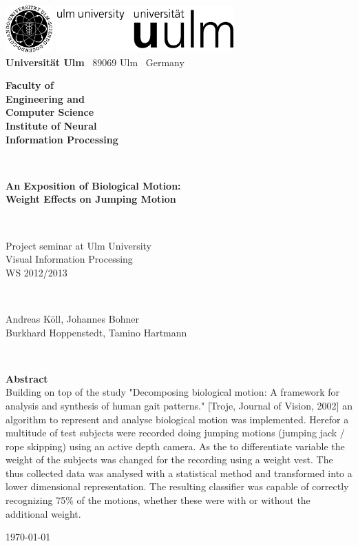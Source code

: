 \documentclass[a4paper]{article}
\begin{document}
\begin{titlepage}
\thispagestyle{empty}


\includegraphics[height=1.8cm]{unilogo_bild}
\hfill
\includegraphics[height=1.8cm]{unilogo_wort}\\[1em]


{\bfseries Universität Ulm} \textbar ~89069 Ulm \textbar ~Germany
\hspace*{38mm}\parbox[t]{38mm}{\bfseries Faculty of \\ Engineering and\\Computer Science\\
\mdseries Institute of Neural\\Information Processing}\\[2cm]

\parbox{140mm}{\bfseries \huge An Exposition of Biological Motion:\\ Weight Effects on Jumping Motion}\\[0.5em]

\parbox{140mm}{Project seminar at Ulm University\\Visual Information Processing \\ WS 2012/2013}\\[3em]

\parbox{140mm}{Andreas Köll, Johannes Bohner \\ Burkhard Hoppenstedt, Tamino Hartmann}\\[4em]



\parbox{140mm}{
{\bfseries\large Abstract}\\
Building on top of the study "Decomposing biological motion: A framework for analysis and synthesis of human gait patterns." [Troje, Journal of Vision, 2002] an algorithm to represent and analyse biological motion was implemented.
Herefor a multitude of test subjects were recorded doing jumping motions (jumping jack / rope skipping) using an active depth camera.
As the to differentiate variable the weight of the subjects was changed for the recording using a weight vest.
The thus collected data was analysed with a statistical method and transformed into a lower dimensional representation.
The resulting classifier was capable of correctly recognizing 75\% of the motions, whether these were with or without the additional weight.
}
\vfill

\parbox{140mm}{\today}



\end{titlepage}
\end{document}

